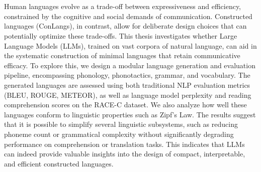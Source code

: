 \chapter{\abstractname}

Human languages evolve as a trade-off between expressiveness and efficiency, constrained by the cognitive and social demands of communication. 
Constructed languages (ConLangs), in contrast, allow for deliberate design choices that can potentially optimize these trade-offs. This thesis 
investigates whether Large Language Models (LLMs), trained on vast corpora of natural language, can aid in the systematic construction of minimal 
languages that retain communicative efficacy. To explore this, we design a modular language generation and evaluation pipeline, encompassing 
phonology, phonotactics, grammar, and vocabulary. The generated languages are assessed using both traditional NLP evaluation metrics (BLEU, ROUGE, METEOR), 
as well as language model perplexity and reading comprehension scores on the RACE-C dataset. We also analyze how well these languages conform to linguistic 
properties such as Zipf's Law. The results suggest that it is possible to simplify several linguistic subsystems, such as reducing phoneme count or 
grammatical complexity without significantly degrading performance on comprehension or translation tasks. This indicates that LLMs can indeed 
provide valuable insights into the design of compact, interpretable, and efficient constructed languages.